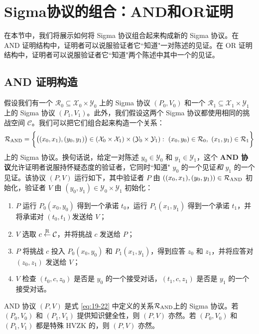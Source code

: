 \section{Sigma协议的组合：AND和OR证明}

在本节中，我们将展示如何将 Sigma 协议组合起来构成新的 Sigma 协议。在 AND 证明结构中，证明者可以说服验证者它``知道"一对陈述的见证。在 OR 证明结构中，证明者可以说服验证者它``知道"两个陈述中其中一个的见证。

\subsection{AND 证明构造}

假设我们有一个 $\mathcal{R}_0\subseteq\mathcal{X}_0\times\mathcal{Y}_0$ 上的 Sigma 协议 $(P_0,V_0)$ 和一个 $\mathcal{R}_1\subseteq\mathcal{X}_1\times\mathcal{Y}_1$ 上的 Sigma 协议 $(P_1,V_1)$。此外，我们假设这两个 Sigma 协议都使用相同的挑战空间 $\mathcal{C}$。我们可以把它们组合起来构造一个关系：
\begin{equation}\label{eq:19-22}
\mathcal{R}_{\rm AND}=
\bigg\lbrace
\big((x_0,x_1),(y_0,y_1)\big)\in\left(\mathcal{X}_0\times\mathcal{X}_1\right)\times\left(\mathcal{Y}_0\times\mathcal{Y}_1\right):~(x_0,y_0)\in\mathcal{R}_0,~(x_1,y_1)\in\mathcal{R}_1
\bigg\rbrace
\end{equation}
上的 Sigma 协议。换句话说，给定一对陈述 $y_0\in\mathcal{Y}_0$ 和 $y_1\in\mathcal{Y}_1$，这个 \textbf{AND 协议}允许证明者说服持怀疑态度的验证者，它同时``知道" $y_0$ 的一个见证\emph{和} $y_1$ 的一个见证。该协议 $(P,V)$ 运行如下，其中验证者 $P$ 由 $((x_0,x_1),(y_0,y_1))\in\mathcal{R}_{\rm AND}$ 初始化，验证者 $V$ 由 $(y_0,y_1)\in\mathcal{Y}_0\times\mathcal{Y}_1$ 初始化：
\begin{enumerate}
	\item $P$ 运行 $P_0(x_0,y_0)$ 得到一个承诺 $t_0$，运行 $P_1(x_1,y_1)$ 得到一个承诺 $t_1$，并将承诺对 $(t_0,t_1)$发送给 $V$；
	\item $V$ 选取 $c\overset{\rm R}\leftarrow\mathcal{C}$，并将挑战 $c$ 发送给 $P$；
	\item $P$ 将挑战 $c$ 投入 $P_0(x_0,y_0)$ 和 $P_1(x_1,y_1)$，得到应答 $z_0$ 和 $z_1$，并将应答对 $(z_0,z_1)$ 发送给 $V$；
	\item $V$ 检查 $(t_0,c,z_0)$ 是否是 $y_0$ 的一个接受对话，$(t_1,c,z_1)$ 是否是 $y_1$ 的一个接受对话。
\end{enumerate}

\begin{theorem}
AND 协议 $(P,V)$ 是式 \ref{eq:19-22} 中定义的关系$\mathcal{R}_{\rm AND}$上的 Sigma 协议。若 $(P_0,V_0)$ 和 $(P_1,V_1)$ 提供知识健全性，则 $(P, V)$ 亦然。若 $(P_0,V_0)$ 和 $(P_1,V_1)$ 都是特殊 HVZK 的，则 $(P,V)$ 亦然。
\end{theorem}

